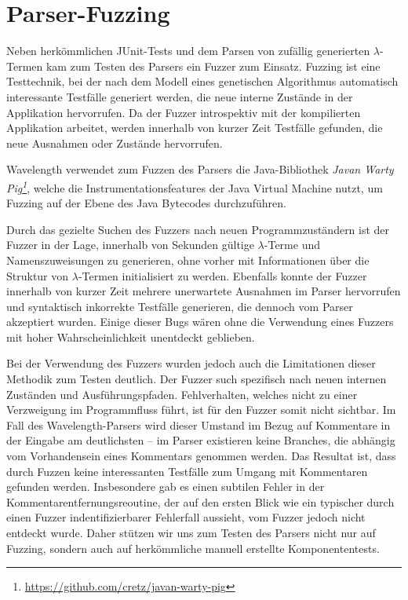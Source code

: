 \documentclass[parskip=full,11pt,openany]{scrreprt}
\begin{document}
\section{Parser-Fuzzing}
Neben herkömmlichen JUnit-Tests und dem Parsen von zufällig generierten
$\lambda$-Termen kam zum Testen des Parsers ein Fuzzer zum Einsatz. Fuzzing ist
eine Testtechnik, bei der nach dem Modell eines genetischen Algorithmus
automatisch interessante Testfälle generiert werden, die neue interne Zustände
in der Applikation hervorrufen. Da der Fuzzer introspektiv mit der kompilierten
Applikation arbeitet, werden innerhalb von kurzer Zeit Testfälle gefunden, die
neue Ausnahmen oder Zustände hervorrufen.

Wavelength verwendet zum Fuzzen des Parsers die Java-Bibliothek
\textit{Javan Warty Pig\footnote{\url{https://github.com/cretz/javan-warty-pig}}},
welche die Instrumentationsfeatures der Java Virtual Machine nutzt, um Fuzzing
auf der Ebene des Java Bytecodes durchzuführen.

Durch das gezielte Suchen des Fuzzers nach neuen Programmzuständern ist der
Fuzzer in der Lage, innerhalb von Sekunden gültige $\lambda$-Terme und
Namenszuweisungen zu generieren, ohne vorher mit Informationen über die Struktur
von $\lambda$-Termen initialisiert zu werden. Ebenfalls konnte der Fuzzer innerhalb
von kurzer Zeit mehrere unerwartete Ausnahmen im Parser hervorrufen und syntaktisch
inkorrekte Testfälle generieren, die dennoch vom Parser akzeptiert wurden. Einige
dieser Bugs wären ohne die Verwendung eines Fuzzers mit hoher Wahrscheinlichkeit
unentdeckt geblieben.

Bei der Verwendung des Fuzzers wurden jedoch auch die Limitationen dieser Methodik
zum Testen deutlich. Der Fuzzer such spezifisch nach neuen internen Zuständen und
Ausführungspfaden. Fehlverhalten, welches nicht zu einer Verzweigung im
Programmfluss führt, ist für den Fuzzer somit nicht sichtbar. Im Fall des
Wavelength-Parsers wird dieser Umstand im Bezug auf Kommentare in der Eingabe
am deutlichsten -- im Parser existieren keine Branches, die abhängig vom
Vorhandensein eines Kommentars genommen werden. Das Resultat ist, dass durch
Fuzzen keine interessanten Testfälle zum Umgang mit Kommentaren gefunden werden.
Insbesondere gab es einen subtilen Fehler in der Kommentarentfernungsreoutine,
der auf den ersten Blick wie ein typischer durch einen Fuzzer indentifizierbarer
Fehlerfall aussieht, vom Fuzzer jedoch nicht entdeckt wurde. Daher stützen wir
uns zum Testen des Parsers nicht nur auf Fuzzing, sondern auch auf herkömmliche
manuell erstellte Komponententests.
\end{document}
